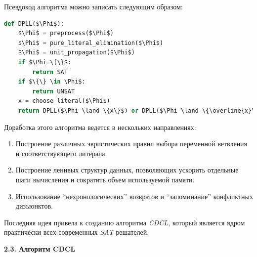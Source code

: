 Псевдокод алгоритма можно записать следующим образом:



\lstset{style=mystyle}

\lstset{xleftmargin=1.5cm,frame=tlbr,framesep=8pt,framerule=0pt}

\begin{lstlisting}[language=Python, mathescape=true]
def DPLL($\Phi$):	
	$\Phi$ = preprocess($\Phi$)
 	$\Phi$ = pure_literal_elimination($\Phi$)
 	$\Phi$ = unit_propagation($\Phi$)	
	if $\Phi=\{\}$:
		return SAT
	if $\{\} \in \Phi$:
		return UNSAT
 	x = choose_literal($\Phi$)
	return DPLL($\Phi \land \{x\}$) or DPLL($\Phi \land \{\overline{x}\}$)
\end{lstlisting}

\vspace{5pt}

Доработка этого алгоритма ведется в нескольких направлениях:

\begin{enumerate}[label=\arabic{*}.]
\item Построение различных эвристических правил выбора переменной ветвления и соответствующего литерала.
\item Построение ленивых структур данных, позволяющих ускорить отдельные шаги вычисления и сократить объем используемой памяти.
\item Использование \enquote{нехронологических} возвратов и \enquote{запоминание} конфликтных дизъюнктов. 
\end{enumerate}

Последняя идея привела к созданию алгоритма \textit{CDCL}, который является ядром практически всех современных \textit{SAT}-решателей.

\vspace{5pt}
\textbf{2.3. Алгоритм CDCL}\label{chapters:2.3}
\vspace{5pt}

